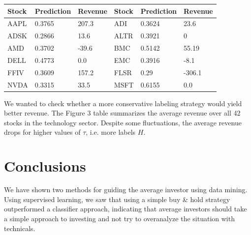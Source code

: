 \documentclass[10pt]{article}
\begin{document}
    \begin{center}
\begin{tabular}{| l | l | l || l | l | l |}
\hline
Stock & Prediction & Revenue & Stock & Prediction & Revenue\\
\hline
AAPL & 0.3765 & 207.3 & ADI & 0.3624 & 23.6\\
\hline
ADSK & 0.2866 & 13.6 &  ALTR & 0.3921 & 0\\
\hline
AMD & 0.3702 & -39.6 & BMC & 0.5142 & 55.19\\
\hline
DELL & 0.4773 & 0.0 & EMC & 0.3916 & -8.1\\
\hline
FFIV & 0.3609 & 157.2 & FLSR & 0.29 & -306.1\\
\hline
NVDA & 0.3315 & 33.5 & MSFT & 0.6155 & 0.0\\
\hline
\end{tabular}
    \end{center}

We wanted to check whether a more conservative labeling strategy would yield
better revenue. The Figure 3 table summarizes the average revenue over all 42
stocks in the technology sector. Despite some fluctuations, the average revenue
drops for higher values of $\tau$, i.e. more labels $H$.
% 
\section{Conclusions}
\label{sec:conclusion}

We have shown two methods for guiding the average investor using data mining.
Using supervised learning, we saw that using a simple buy \& hold strategy
outperformed a classifier approach, indicating that average investors
should take a simple approach to investing and not try to overanalyze the
situation with technicals.
\end{document}
